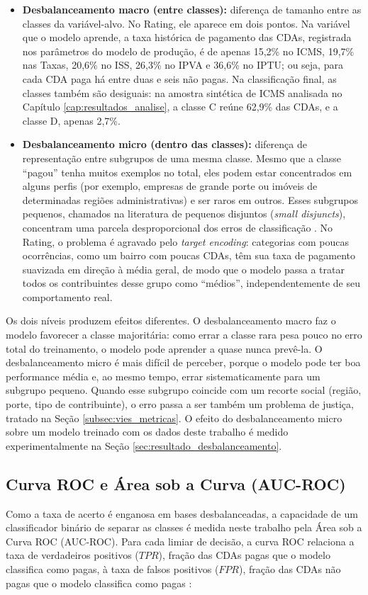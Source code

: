 \begin{itemize}
    \item \textbf{Desbalanceamento macro (entre classes):} diferença de tamanho entre as classes da variável-alvo. No Rating, ele aparece em dois pontos. Na variável que o modelo aprende, a taxa histórica de pagamento das CDAs, registrada nos parâmetros do modelo de produção, é de apenas 15,2\% no ICMS, 19,7\% nas Taxas, 20,6\% no ISS, 26,3\% no IPVA e 36,6\% no IPTU; ou seja, para cada CDA paga há entre duas e seis não pagas. Na classificação final, as classes também são desiguais: na amostra sintética de ICMS analisada no Capítulo \ref{cap:resultados_analise}, a classe C reúne 62,9\% das CDAs, e a classe D, apenas 2,7\%.
    \item \textbf{Desbalanceamento micro (dentro das classes):} diferença de representação entre subgrupos de uma mesma classe. Mesmo que a classe ``pagou'' tenha muitos exemplos no total, eles podem estar concentrados em alguns perfis (por exemplo, empresas de grande porte ou imóveis de determinadas regiões administrativas) e ser raros em outros. Esses subgrupos pequenos, chamados na literatura de pequenos disjuntos (\textit{small disjuncts}), concentram uma parcela desproporcional dos erros de classificação \cite{joClassImbalancesSmall2004}. No Rating, o problema é agravado pelo \textit{target encoding}: categorias com poucas ocorrências, como um bairro com poucas CDAs, têm sua taxa de pagamento suavizada em direção à média geral, de modo que o modelo passa a tratar todos os contribuintes desse grupo como ``médios'', independentemente de seu comportamento real.
\end{itemize}

Os dois níveis produzem efeitos diferentes. O desbalanceamento macro faz o modelo favorecer a classe majoritária: como errar a classe rara pesa pouco no erro total do treinamento, o modelo pode aprender a quase nunca prevê-la. O desbalanceamento micro é mais difícil de perceber, porque o modelo pode ter boa performance média e, ao mesmo tempo, errar sistematicamente para um subgrupo pequeno. Quando esse subgrupo coincide com um recorte social (região, porte, tipo de contribuinte), o erro passa a ser também um problema de justiça, tratado na Seção \ref{subsec:vies_metricas}. O efeito do desbalanceamento micro sobre um modelo treinado com os dados deste trabalho é medido experimentalmente na Seção \ref{sec:resultado_desbalanceamento}.

\subsection{Curva ROC e Área sob a Curva (AUC-ROC)}
Como a taxa de acerto é enganosa em bases desbalanceadas, a capacidade de um classificador binário de separar as classes é medida neste trabalho pela Área sob a Curva ROC (AUC-ROC). Para cada limiar de decisão, a curva ROC relaciona a taxa de verdadeiros positivos ($TPR$), fração das CDAs pagas que o modelo classifica como pagas, à taxa de falsos positivos ($FPR$), fração das CDAs não pagas que o modelo classifica como pagas \cite{noriegaMachineLearningCredit2023, changCreditRiskPrediction2024}:


